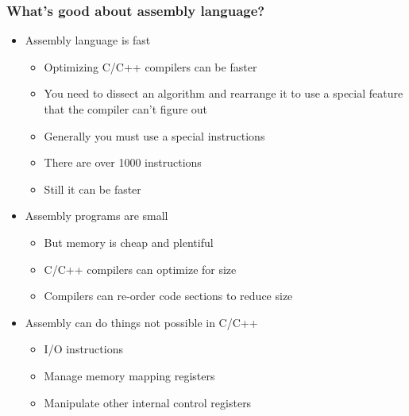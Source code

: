 \documentclass{beamer}
\begin{document}
\begin{frame}
    \frametitle{What's good about assembly language?}
    \begin{itemize}
        \item Assembly language is fast
        \begin{itemize}
            \item Optimizing C/C++ compilers can be faster
            \item You need to dissect an algorithm and rearrange it to use
                  a special feature that the compiler can't figure out
            \item Generally you must use a special instructions
            \item There are over 1000 instructions
            \item Still it can be faster
        \end{itemize}
        \item Assembly programs are small
        \begin{itemize}
            \item But memory is cheap and plentiful
            \item C/C++ compilers can optimize for size
            \item Compilers can re-order code sections to reduce size
        \end{itemize}
        \item Assembly can do things not possible in C/C++
        \begin{itemize}
            \item I/O instructions
            \item Manage memory mapping registers
            \item Manipulate other internal control registers
        \end{itemize}

    \end{itemize}
\end{frame}
\end{document}
